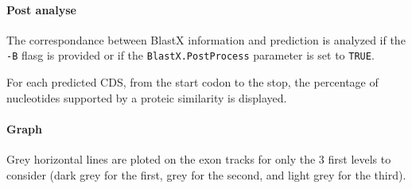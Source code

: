 \paragraph{Post analyse}

The correspondance between BlastX information and prediction is
analyzed if the \texttt{-B} flasg  is provided or if the
\texttt{BlastX.PostProcess} parameter is set to \texttt{TRUE}.

For each predicted CDS, from the start codon to the stop, the
percentage of nucleotides supported by a proteic similarity is
displayed.

\paragraph{Graph}

Grey horizontal lines are ploted on the exon tracks for only the 3
first levels to consider (dark grey for the first, grey for the
second, and light grey for the third).

